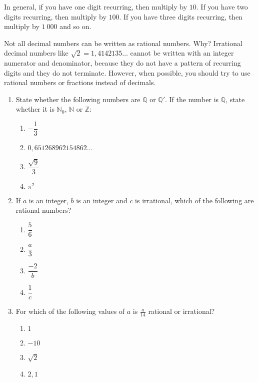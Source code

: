 In general, if you have one digit recurring, then multiply by $10$. If
you have two digits recurring, then multiply by $100$. If you have
three digits recurring, then multiply by $1~000$ and so on.\par

Not all decimal numbers can be written as rational numbers. Why? Irrational decimal numbers like 
$\sqrt{2}=1,4142135\ldots$
cannot be written with an integer numerator and denominator, because they do not have a pattern of recurring digits and they do not terminate. However, when possible, you should try to use rational numbers or fractions instead of decimals.




\begin{exercises}{}{
\begin{enumerate}[itemsep=5pt, label=\textbf{\arabic*}. ] 
\item State whether the following numbers are $\mathbb{Q}$ or $\mathbb{Q'}$. If the number is $\mathbb{Q}$, state whether it is $\mathbb{N}_0$, $\mathbb{N}$ or $\mathbb{Z}$:
\begin{enumerate}[itemsep=5pt, label=\textbf{(\alph*)} ] 
    \item $-\dfrac{1}{3}$
    \item $0,651268962154862\ldots$
    \item $\dfrac{\sqrt{9}}{3}$
    \item $\pi^2$
\end{enumerate}
\item If $a$ is an integer, $b$ is an integer and $c$ is irrational, which of the following are rational numbers? 
  \begin{enumerate}[itemsep=5pt, label=\textbf{(\alph*)} ] 
    \item $\dfrac{5}{6}$
    \item $\dfrac{a}{3}$
    \item $\dfrac{-2}{b}$
    \item $\dfrac{1}{c}$
    \end{enumerate}
\item For which of the following values of $a$ is $\frac{a}{14}$ rational or irrational?
    \begin{enumerate}[itemsep=0pt, label=\textbf{(\alph*)} ] 
    \item $1$
    \item $-10$
    \item $\sqrt{2}$
    \item $2,1$

\end{enumerate}
\end{enumerate}}
\end{exercises}
